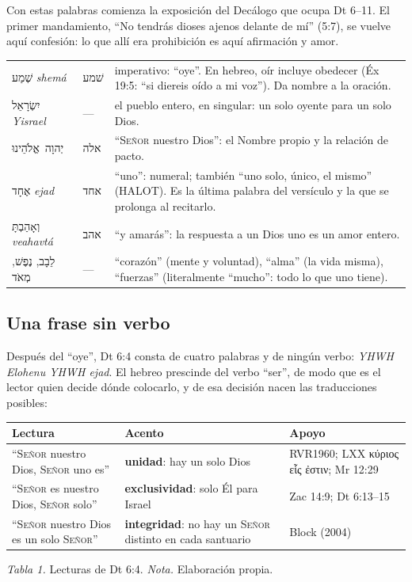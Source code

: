 \documentclass[11pt,letterpaper]{article}
\newcommand{\heb}[1]{\mbox{\foreignlanguage{hebrew}{#1}}}
\newcommand{\grc}[1]{\foreignlanguage{ancientgreek}{#1}}
\newcommand{\SENOR}{\textsc{Señor}}
\newcommand{\destacar}[1]{\textbf{\textcolor{azul}{#1}}}
\begin{document}
Con estas palabras comienza la exposición del Decálogo que ocupa Dt 6--11. El primer mandamiento, ``No tendrás dioses ajenos delante de mí'' (5:7), se vuelve aquí confesión: lo que allí era prohibición es aquí afirmación y amor.

\begin{filologia}[Dt 6:4--5]
\begin{tabular}{@{}L{3.4cm}L{1.6cm}L{9.8cm}@{}}
\heb{שְׁמַע} \emph{shemá} & \heb{שׁמע} & imperativo: ``oye''. En hebreo, oír incluye obedecer (Éx 19:5: ``si diereis oído a mi voz''). Da nombre a la oración. \\[2pt]
\heb{יִשְׂרָאֵל} \emph{Yisrael} & --- & el pueblo entero, en singular: un solo oyente para un solo Dios. \\[2pt]
\heb{יְהוָה אֱלֹהֵינוּ} & \heb{אלה} & ``\SENOR{} nuestro Dios'': el Nombre propio y la relación de pacto. \\[2pt]
\heb{אֶחָד} \emph{ejad} & \heb{אחד} & ``uno'': numeral; también ``uno solo, único, el mismo'' (HALOT). Es la última palabra del versículo y la que se prolonga al recitarlo. \\[2pt]
\heb{וְאָהַבְתָּ} \emph{veahavtá} & \heb{אהב} & ``y amarás'': la respuesta a un Dios uno es un amor entero. \\[2pt]
\heb{לֵבָב}, \heb{נֶפֶשׁ}, \heb{מְאֹד} & --- & ``corazón'' (mente y voluntad), ``alma'' (la vida misma), ``fuerzas'' (literalmente ``mucho'': todo lo que uno tiene). \\
\end{tabular}
\end{filologia}

\subsection{Una frase sin verbo}
Después del ``oye'', Dt 6:4 consta de cuatro palabras y de ningún verbo: \emph{YHWH Elohenu YHWH ejad}. El hebreo prescinde del verbo ``ser'', de modo que es el lector quien decide dónde colocarlo, y de esa decisión nacen las traducciones posibles:

\begin{center}\small\renewcommand{\arraystretch}{1.3}
\begin{tabular}{@{}L{5.0cm}L{4.4cm}L{4.8cm}@{}}
\toprule
\textbf{Lectura} & \textbf{Acento} & \textbf{Apoyo} \\ \midrule
``\SENOR{} nuestro Dios, \SENOR{} uno es'' & \destacar{unidad}: hay un solo Dios & RVR1960; LXX \grc{κύριος εἷς ἐστιν}; Mr 12:29 \\
``\SENOR{} es nuestro Dios, \SENOR{} solo'' & \destacar{exclusividad}: solo Él para Israel & Zac 14:9; Dt 6:13--15 \\
``\SENOR{} nuestro Dios es un solo \SENOR'' & \destacar{integridad}: no hay un \SENOR{} distinto en cada santuario & Block (2004) \\
\bottomrule
\end{tabular}\par
{\footnotesize\color{gris}\textit{Tabla 1.} Lecturas de Dt 6:4. \textit{Nota.} Elaboración propia.}
\end{center}
\end{document}
